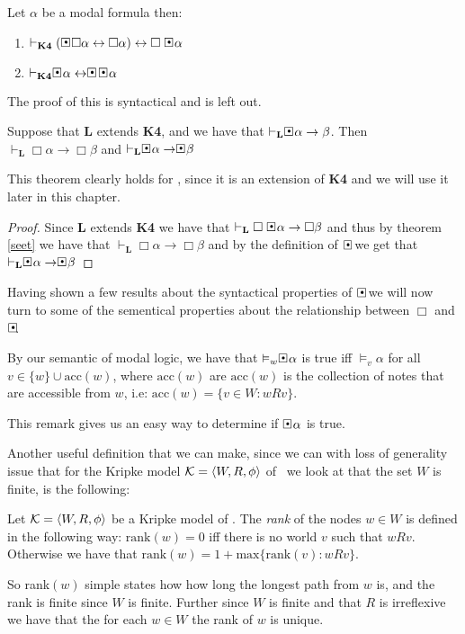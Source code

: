 \documentclass[../main.tex]{subfiles}
\begin{document}
\begin{thm}
	\label{seet}
	Let $\alpha$ be a modal formula then:
	\begin{enumerate}
		\item $\vdash_{\textbf{K4}}(\sBox\Box\alpha\leftrightarrow\Box\alpha)\leftrightarrow
	\Box\sBox \alpha$
	\item $\vdash_{\textbf{K4}}\sBox\alpha\leftrightarrow\sBox\
		\sBox\alpha$
	\end{enumerate}
\end{thm}
The proof of this is syntactical and is left out.
\begin{thm}
	\label{GLsæt}
	Suppose that \textbf{L} extends \textbf{K4}, and we have that
	$\vdash_{\textbf{L}}\sBox\alpha\rightarrow\beta$. Then
	$\vdash_{\textbf{L}}\Box\alpha\rightarrow\Box\beta$ and
	$\vdash_{\textbf{L}}\sBox\alpha\rightarrow\sBox\beta$
\end{thm}
This theorem clearly holds for \GL, since it is an extension of \textbf{K4} and we will use it later in this chapter.
\begin{proof}
	Since \textbf{L} extends \textbf{K4} we have that
	$\vdash_{\textbf{L}}\Box\sBox\alpha\rightarrow\Box\beta$ and thus by
	theorem \ref{seet} we have that
	$\vdash_{\textbf{L}}\Box\alpha\rightarrow\Box\beta$ and by the
	definition of $\sBox$ we get that
	$\vdash_{\textbf{L}}\sBox\alpha\rightarrow\sBox\beta$
\end{proof}
Having shown a few results about the syntactical  properties of $\sBox$ we will now
turn to some of the sementical properties about the relationship between $\Box$
and $\sBox$.
\begin{remark}
	\label{rem:acc}
By our semantic of modal logic,  we have that $\vDash_w\sBox\alpha$ is true iff $\vDash_v\alpha$
for all $v\in\{w\}\cup\text{acc}(w)$, where $\text{acc}(w)$ are $\text{acc}(w)$
is the collection of notes that are accessible  from $w$, i.e:
$\text{acc}(w)=\{v\in W:wRv\}$.
\end{remark}

This remark gives us an easy way to determine if $\sBox \alpha$ is true.


Another useful definition that we can make, since we can with loss of
generality issue that  for the  Kripke model 
$\mathcal{K}=\langle W,R,\phi\rangle$ of \GL\  we look at that the set $W$ is finite,
is the following:
\begin{defi}
	Let $\mathcal{K}=\langle W,R,\phi\rangle$ be a Kripke model of \GL. The
	\textit{rank} of the nodes $w\in W$ is defined in the following
	way: $\text{rank}(w)=0$ iff there is no world $v$ such that
	$wRv$. Otherwise we have that
	$\text{rank}(w)=1+\text{max}\{\text{rank}(v):wRv\}$.
\end{defi}
So rank$(w)$ simple states how how long the longest path from $w$ is, and the
rank is finite since $W$ is finite.
Further since $W$ is finite and that $R$ is irreflexive we have that the for each $w\in
W$ the rank of $w$ is unique.
\end{document}
